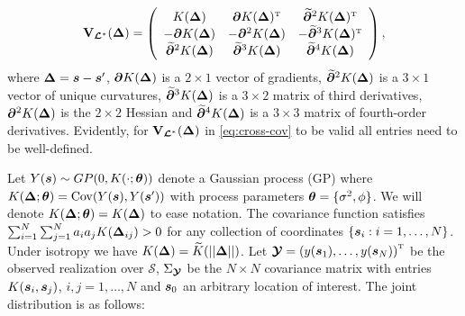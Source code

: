 \begin{equation}\label{eq:cross-cov}
    \bV_{\L^*}(\bDelta) =\left(\begin{array}{ccc}
        K(\bDelta) &  \bpartial K(\bDelta)^{\T} & \widetilde{\bpartial}^2 K(\bDelta)^{\T} \\
         -\bpartial K(\bDelta) & -\bpartial^2K(\bDelta) & -\widetilde{\bpartial}^3K(\bDelta)^{\T}\\
         \widetilde{\bpartial}^{2}K(\bDelta) & \widetilde{\bpartial}^3K(\bDelta) & \widetilde{\bpartial}^4K(\bDelta)
    \end{array}\right), 
\end{equation}
where $\bDelta = \bs-\bs'$, $\bpartial K(\bDelta)$ is a $2\times 1$ vector of gradients, $\widetilde{\bpartial}^2K(\bDelta)$ is a $3\times 1$ vector of unique curvatures, $\widetilde{\bpartial}^3K(\bDelta)$ is a $3\times 2$ matrix of third derivatives, $\bpartial^2K(\bDelta)$ is the $2\times 2$ Hessian and $\widetilde{\bpartial}^4K(\bDelta)$ is a $3\times 3$ matrix of fourth-order derivatives. Evidently, for $\bV_{\L^*}(\bDelta)$ in \ref{eq:cross-cov} to be valid all entries need to be well-defined.

Let $Y(\bs)\sim GP(0, K(\cdot;\btheta))$ denote a Gaussian process (GP) where $K(\bDelta;\btheta)= \Cov(Y(\bs), Y(\bs'))$ with process parameters $\btheta = \{\sigma^2, \phi\}$. We will denote $K(\bDelta;\btheta)=K(\bDelta)$ to ease notation. The covariance function satisfies $\sum_{i=1}^{N}\sum_{j=1}^{N}a_ia_jK(\bDelta_{ij})>0$ for any collection of coordinates $\{\bs_i:i = 1,\ldots,N\}$. Under isotropy we have $K(\bDelta)=\widetilde{K}(||\bDelta||)$. Let $\Y = \left(y(\bs_1), \ldots, y(\bs_N)\right)^{\T}$ be the observed realization over $\mathscr{S}$, $\Sigma_\Y$ be the $N\times N$ covariance matrix with entries $K(\bs_i,\bs_j)$, $i, j = 1, \ldots, N$ and $\bs_0$ an arbitrary location of interest. The joint distribution is as follows:

